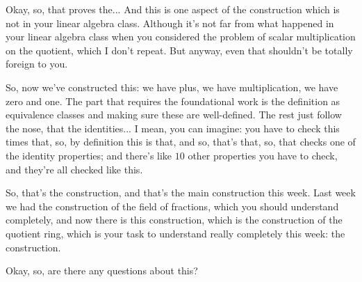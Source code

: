 \begin{speech}[00:47:25 - 00:48:47]
Okay, so, that proves the...  And this is one aspect of the construction which is not in your linear algebra class. Although it's not far from what happened in your linear algebra class when you considered the problem of scalar multiplication on the quotient, which I don't repeat. But anyway, even that shouldn't be totally foreign to you. 

So, now we've constructed this: we have plus, we have multiplication, we have zero and one.  The part that requires the foundational work is the definition as equivalence classes and making sure these are well-defined. The rest just follow the nose, that the identities... I mean, you can imagine: you have to check this times that, so, by definition this is that, and so, that's that, so, that checks one of the identity properties; and there's like $10$ other properties you have to check, and they're all checked like this.  

So, that's the construction, and that's the main construction this week. Last week we had the construction of the field of fractions, which you should understand completely, and now there is this construction, which is the construction of the quotient ring, which is your task to understand really completely this week: the construction. 

Okay, so, are there any questions about this?
\end{speech}

